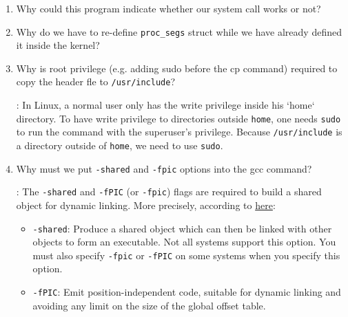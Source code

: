 \begin{enumerate}[1.]
\begin{itemize}
    \end{itemize}
  \item Why could this program indicate whether our system call works or not?
  \item Why do we have to re-define \lstinline{proc_segs} struct while we have already defined it inside the kernel?
  \item Why is root privilege (e.g. adding sudo before the cp command) required to copy the header fle to \lstinline{/usr/include}?
    \par {}: In Linux, a normal user only has the write privilege inside his `home` directory. To have write privilege to directories outside \lstinline{home}, one needs \lstinline{sudo} to run the command with the superuser's privilege. Because \lstinline{/usr/include} is a directory outside of \lstinline{home}, we need to use \lstinline{sudo}.
  \item Why must we put \lstinline{-shared} and \lstinline{-fpic} options into the gcc command?
    \par {}: The \lstinline{-shared} and \lstinline{-fPIC} (or \lstinline{-fpic}) flags are required to build a shared object for dynamic linking. More precisely, according to \href{https://gcc.gnu.org/onlinedocs/gcc-2.95.2/gcc_2.html#SEC13}{here}:
    \begin{itemize}
      \item \lstinline{-shared}: Produce a shared object which can then be linked with other objects to form an executable. Not all systems support this option. You must also specify \lstinline{-fpic} or \lstinline{-fPIC} on some systems when you specify this option.
      \item \lstinline{-fPIC}: Emit position-independent code, suitable for dynamic linking and avoiding any limit on the size of the global offset table.
    \end{itemize}
\end{enumerate}
